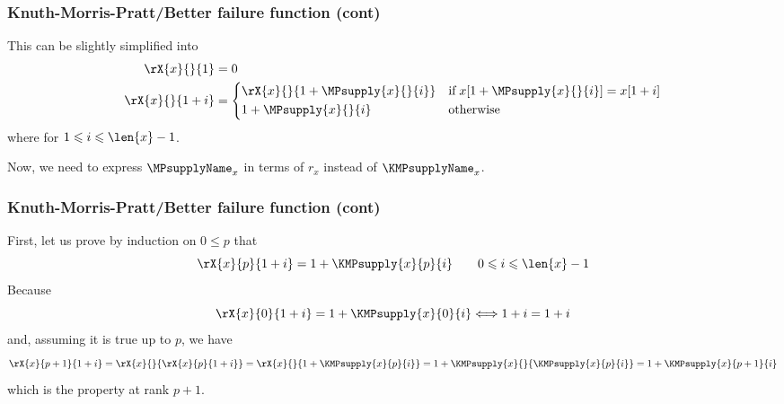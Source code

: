%
\begin{frame}
\frametitle{Knuth-Morris-Pratt/Better failure function (cont)}

This can be slightly simplified into
\begin{align*}
   \rX{x}{}{1} 
&= 0\\
   \rX{x}{}{1+i}
&= \left\lbrace
   \begin{aligned}
   & \rX{x}{}{1 + \MPsupply{x}{}{i}}
   && \text{if} \; x [1 + \MPsupply{x}{}{i}] = x [1 + i]\\
   & 1 + \MPsupply{x}{}{i}
   && \text{otherwise}
   \end{aligned}
   \right.
\end{align*}
where for \(1 \leqslant i \leqslant \len{x}-1\).

\bigskip

Now, we need to express \(\MPsupplyName_{x}\) in terms of \(r_{x}\)
instead of \(\KMPsupplyName_{x}\). 

\end{frame}

%
\begin{frame}
\frametitle{Knuth-Morris-Pratt/Better failure function (cont)}

First, let us prove by induction on \(0 \leqslant p\) that
\[
\rX{x}{p}{1+i} = 1 + \KMPsupply{x}{p}{i} \qquad 0 \leqslant i
\leqslant \len{x} - 1
\]
Because 
\[
\rX{x}{0}{1+i} = 1 + \KMPsupply{x}{0}{i}
\Longleftrightarrow
1 + i = 1 + i
\]
and, assuming it is true up to \(p\), we have
\[
  \rX{x}{p+1}{1+i}
= \rX{x}{}{\rX{x}{p}{1+i}} = \rX{x}{}{1 + \KMPsupply{x}{p}{i}}
= 1 + \KMPsupply{x}{}{\KMPsupply{x}{p}{i}}
= 1 + \KMPsupply{x}{p+1}{i}
\]
which is the property at rank \(p+1\).

\end{frame}

